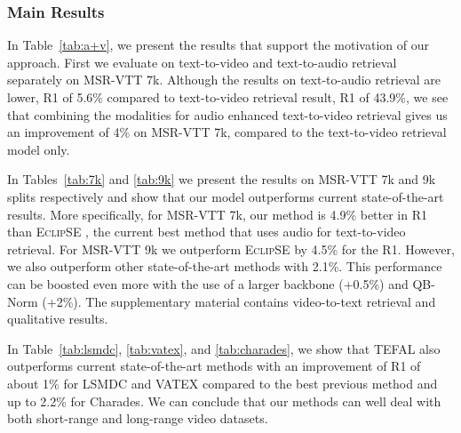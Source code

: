 \documentclass[10pt,twocolumn,letterpaper]{article}
\begin{document}
\subsubsection{Main Results}
In Table~\ref{tab:a+v}, we present the results that support the motivation of our approach. First we evaluate on text-to-video and text-to-audio retrieval separately on MSR-VTT 7k. Although the results on text-to-audio retrieval are lower, R1 of 5.6\% compared to text-to-video retrieval result, R1 of 43.9\%, we see that combining the modalities for audio enhanced text-to-video retrieval gives us an improvement of 4\% on MSR-VTT 7k, compared to the text-to-video retrieval model only. 

In Tables~\ref{tab:7k} and \ref{tab:9k} we present the results on MSR-VTT 7k and 9k splits respectively and show that our model outperforms current state-of-the-art results. More specifically, for MSR-VTT 7k, our method is 4.9\% better in R1 than E\textsc{clip}SE \cite{ECLIPSE_ECCV22}, the current best method that uses audio for text-to-video retrieval. For MSR-VTT 9k we outperform E\textsc{clip}SE by 4.5\% for the R1. However, we also outperform other state-of-the-art methods with 2.1\%. This performance can be boosted even more with the use of a larger backbone (+0.5\%) and QB-Norm (+2\%). The supplementary material contains video-to-text retrieval and qualitative results.

In Table~\ref{tab:lsmdc}, \ref{tab:vatex}, and \ref{tab:charades}, we show that TEFAL also outperforms current state-of-the-art methods with an improvement of R1 of about 1\% for LSMDC and VATEX compared to the best previous method and up to 2.2\% for Charades. We can conclude that our methods can well deal with both short-range and long-range video datasets. 

\begin{table}
\centering
{}
 \caption{Results on the test split of LSMDC \cite{lsmdc}}
  \label{tab:lsmdc}
\end{table}
\end{document}
